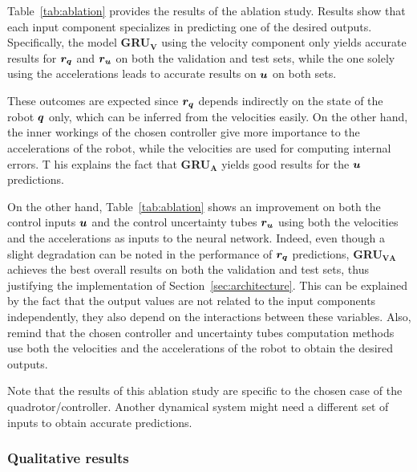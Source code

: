 Table~\ref{tab:ablation} provides the results of the ablation study.
Results show that each input component specializes in predicting one of the desired outputs.
Specifically, the model \textbf{GRU$\boldsymbol{_V}$} using the velocity component only yields accurate results for $\boldsymbol{r_q}$ and $\boldsymbol{r_u}$ on both the validation and test sets, while the one solely using the accelerations leads to accurate results on $\boldsymbol{u}$ on both sets.

These outcomes are expected since $\boldsymbol{r_q}$ depends indirectly on the state of the robot $\boldsymbol{q}$ only, which can be inferred from the velocities easily. 
On the other hand, the inner workings of the chosen controller give more importance to the accelerations of the robot, while the velocities are used for computing internal errors. T
his explains the fact that \textbf{GRU$\boldsymbol{_A}$} yields good results for the $\boldsymbol{u}$ predictions.

On the other hand, Table~\ref{tab:ablation} shows an improvement on both the control inputs $\boldsymbol{u}$ and the control uncertainty tubes $\boldsymbol{r_u}$ using both the velocities and the accelerations as inputs to the neural network. 
Indeed, even though a slight degradation can be noted in the performance of $\boldsymbol{r_q}$ predictions, \textbf{GRU$\boldsymbol{_{VA}}$} achieves the best overall results on both the validation and test sets, thus justifying the implementation of Section~\ref{sec:architecture}. 
This can be explained by the fact that the output values are not related to the input components independently, they also depend on the interactions between these variables. 
Also, remind that the chosen controller and uncertainty tubes computation methods use both the velocities and the accelerations of the robot to obtain the desired outputs.

Note that the results of this ablation study are specific to the chosen case of the quadrotor/controller.
Another dynamical system might need a different set of inputs to obtain accurate predictions.

\subsubsection{Qualitative results}

